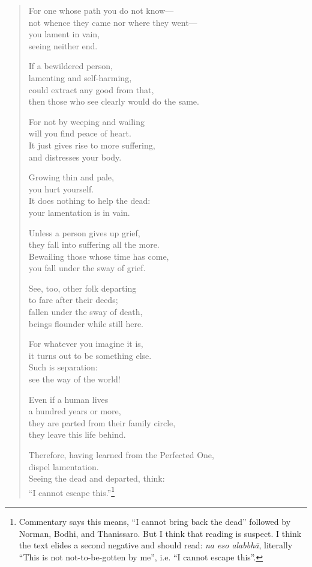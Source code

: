 \documentclass[12pt,openany]{book}%
\begin{document}
\begin{verse}
For one whose path you do not know—\\
not whence they came nor where they went—\\
you lament in vain, \\
seeing neither end. 

If a bewildered person, \\
lamenting and self-harming, \\
could extract any good from that, \\
then those who see clearly would do the same. 

For not by weeping and wailing \\
will you find peace of heart. \\
It just gives rise to more suffering, \\
and distresses your body. 

Growing thin and pale, \\
you hurt yourself. \\
It does nothing to help the dead: \\
your lamentation is in vain. 

Unless a person gives up grief, \\
they fall into suffering all the more. \\
Bewailing those whose time has come, \\
you fall under the sway of grief. 

See, too, other folk departing \\
to fare after their deeds; \\
fallen under the sway of death, \\
beings flounder while still here. 

For whatever you imagine it is, \\
it turns out to be something else. \\
Such is separation: \\
see the way of the world! 

Even if a human lives \\
a hundred years or more, \\
they are parted from their family circle, \\
they leave this life behind. 

Therefore, having learned from the Perfected One, \\
dispel lamentation. \\
Seeing the dead and departed, think: \\
“I cannot escape this.”\footnote{Commentary says this means, “I cannot bring back the dead” followed by Norman, Bodhi, and Thanissaro. But I think that reading is suspect. I think the text elides a second negative and should read: \textit{na eso \textsanskrit{alabbhā}}, literally “This is not not-to-be-gotten by me”, i.e. “I cannot escape this”. } 


\end{verse}
\end{document}

